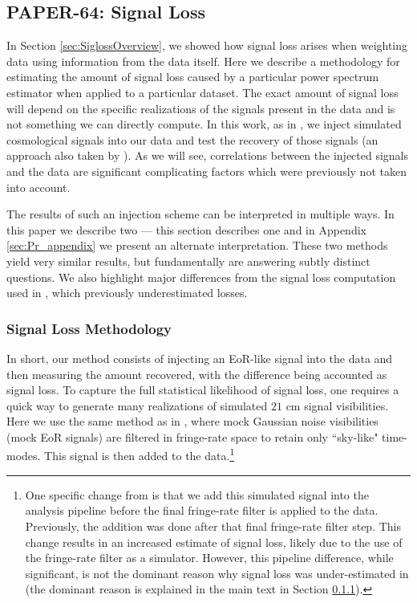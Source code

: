 \documentclass[preprint2,numberedappendix,tighten]{aastex6}  %
\begin{document}

\subsection{PAPER-64: Signal Loss}
\label{sec:Sigloss}

In Section \ref{sec:SiglossOverview}, we showed how signal loss arises when weighting data using information from the data itself. Here we describe a methodology for estimating the amount of signal loss caused by a particular power spectrum estimator when applied to a particular dataset. The exact amount of signal loss will depend on the specific realizations of the signals present in the data and is not something we can directly compute. In this work, as in , we inject simulated cosmological signals into our data and test the recovery of those signals (an approach also taken by \citet{masui_et_al2013}). As we will see, correlations between the injected signals and the data are significant complicating factors which were previously not taken into account. 

The results of such an injection scheme can be interpreted in multiple ways. In this paper we describe two --- this section describes one and in Appendix \ref{sec:Pr_appendix} we present an alternate interpretation. These two methods yield very similar results, but fundamentally are answering subtly distinct questions. We also highlight major differences from the signal loss computation used in , which previously underestimated losses. 

\subsubsection{Signal Loss Methodology} 
\label{sec:siglossmethod}
In short, our method consists of injecting an EoR-like signal into the data and then measuring the amount recovered, with the difference being accounted as signal loss.  To capture the full statistical likelihood of signal loss, one requires a quick way to generate many realizations of simulated $21$ 
cm signal visibilities. Here we use the same method as in , where mock Gaussian noise visibilities (mock EoR signals) 
are filtered in fringe-rate space to retain only ``sky-like" time-modes. This signal is then added to the data.\footnote{One 
specific change from  is that we add this simulated signal into the analysis pipeline before the final fringe-rate filter is 
applied to the data. Previously, the addition was done after that final fringe-rate filter step.  This change results in an increased 
estimate of signal loss, %
likely due to the use of the fringe-rate filter as a simulator. However, this pipeline difference, while significant, is not the dominant reason why signal loss was under-estimated in  (the dominant reason is explained in the main text in Section \ref{sec:siglossmethod}).}
\end{document}
